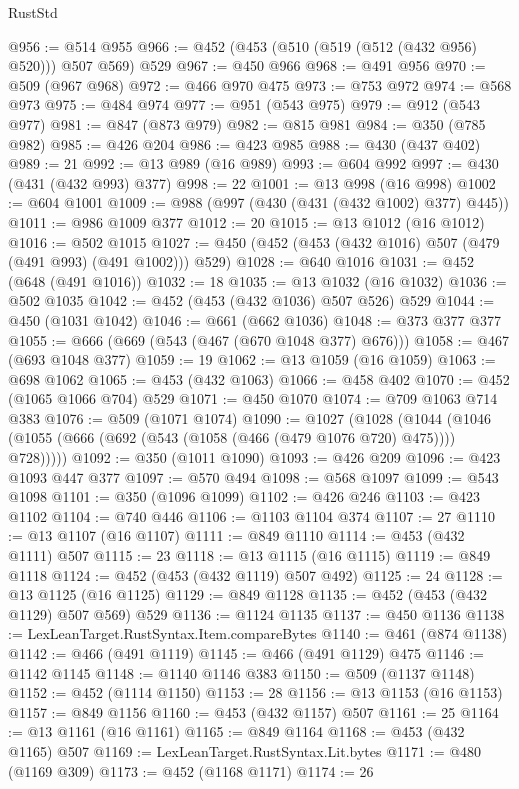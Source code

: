 \begin{lexlean}{RustStd}
\begin{coremodule}
@956 := @514 @955
@966 := @452 (@453 (@510 (@519 (@512 (@432 @956) @520))) @507 @569) @529
@967 := @450 @966
@968 := @491 @956
@970 := @509 (@967 @968)
@972 := @466 @970 @475
@973 := @753 @972
@974 := @568 @973
@975 := @484 @974
@977 := @951 (@543 @975)
@979 := @912 (@543 @977)
@981 := @847 (@873 @979)
@982 := @815 @981
@984 := @350 (@785 @982)
@985 := @426 @204
@986 := @423 @985
@988 := @430 (@437 @402)
@989 := 21
@992 := @13 @989 (@16 @989)
@993 := @604 @992
@997 := @430 (@431 (@432 @993) @377)
@998 := 22
@1001 := @13 @998 (@16 @998)
@1002 := @604 @1001
@1009 := @988 (@997 (@430 (@431 (@432 @1002) @377) @445))
@1011 := @986 @1009 @377
@1012 := 20
@1015 := @13 @1012 (@16 @1012)
@1016 := @502 @1015
@1027 := @450 (@452 (@453 (@432 @1016) @507 (@479 (@491 @993) (@491 @1002))) @529)
@1028 := @640 @1016
@1031 := @452 (@648 (@491 @1016))
@1032 := 18
@1035 := @13 @1032 (@16 @1032)
@1036 := @502 @1035
@1042 := @452 (@453 (@432 @1036) @507 @526) @529
@1044 := @450 (@1031 @1042)
@1046 := @661 (@662 @1036)
@1048 := @373 @377 @377
@1055 := @666 (@669 (@543 (@467 (@670 @1048 @377) @676)))
@1058 := @467 (@693 @1048 @377)
@1059 := 19
@1062 := @13 @1059 (@16 @1059)
@1063 := @698 @1062
@1065 := @453 (@432 @1063)
@1066 := @458 @402
@1070 := @452 (@1065 @1066 @704) @529
@1071 := @450 @1070
@1074 := @709 @1063 @714 @383
@1076 := @509 (@1071 @1074)
@1090 := @1027
    (@1028 (@1044 (@1046 (@1055 (@666 (@692 (@543 (@1058 (@466 (@479 @1076 @720) @475)))) @728)))))
@1092 := @350 (@1011 @1090)
@1093 := @426 @209
@1096 := @423 @1093 @447 @377
@1097 := @570 @494
@1098 := @568 @1097
@1099 := @543 @1098
@1101 := @350 (@1096 @1099)
@1102 := @426 @246
@1103 := @423 @1102
@1104 := @740 @446
@1106 := @1103 @1104 @374
@1107 := 27
@1110 := @13 @1107 (@16 @1107)
@1111 := @849 @1110
@1114 := @453 (@432 @1111) @507
@1115 := 23
@1118 := @13 @1115 (@16 @1115)
@1119 := @849 @1118
@1124 := @452 (@453 (@432 @1119) @507 @492)
@1125 := 24
@1128 := @13 @1125 (@16 @1125)
@1129 := @849 @1128
@1135 := @452 (@453 (@432 @1129) @507 @569) @529
@1136 := @1124 @1135
@1137 := @450 @1136
@1138 := LexLeanTarget.RustSyntax.Item.compareBytes
@1140 := @461 (@874 @1138)
@1142 := @466 (@491 @1119)
@1145 := @466 (@491 @1129) @475
@1146 := @1142 @1145
@1148 := @1140 @1146 @383
@1150 := @509 (@1137 @1148)
@1152 := @452 (@1114 @1150)
@1153 := 28
@1156 := @13 @1153 (@16 @1153)
@1157 := @849 @1156
@1160 := @453 (@432 @1157) @507
@1161 := 25
@1164 := @13 @1161 (@16 @1161)
@1165 := @849 @1164
@1168 := @453 (@432 @1165) @507
@1169 := LexLeanTarget.RustSyntax.Lit.bytes
@1171 := @480 (@1169 @309)
@1173 := @452 (@1168 @1171)
@1174 := 26

\end{coremodule}
\end{lexlean}
